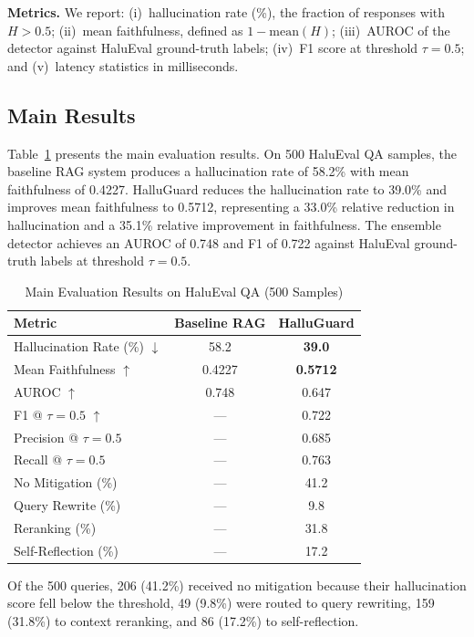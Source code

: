 \documentclass[conference]{IEEEtran}
\begin{document}
\textbf{Metrics.} We report: (i)~hallucination rate (\%), the fraction of responses with $H > 0.5$; (ii)~mean faithfulness, defined as $1 - \text{mean}(H)$; (iii)~AUROC of the detector against HaluEval ground-truth labels; (iv)~F1 score at threshold $\tau = 0.5$; and (v)~latency statistics in milliseconds.

\subsection{Main Results}

Table~\ref{tab:main_results} presents the main evaluation results. On 500 HaluEval QA samples, the baseline RAG system produces a hallucination rate of 58.2\% with mean faithfulness of 0.4227. HalluGuard reduces the hallucination rate to 39.0\% and improves mean faithfulness to 0.5712, representing a 33.0\% relative reduction in hallucination and a 35.1\% relative improvement in faithfulness. The ensemble detector achieves an AUROC of 0.748 and F1 of 0.722 against HaluEval ground-truth labels at threshold $\tau = 0.5$.

\begin{table}[t]
\centering
\caption{Main Evaluation Results on HaluEval QA (500 Samples)}
\label{tab:main_results}
\begin{tabular}{lcc}
\toprule
\textbf{Metric} & \textbf{Baseline RAG} & \textbf{HalluGuard} \\
\midrule
Hallucination Rate (\%) $\downarrow$ & 58.2 & \textbf{39.0} \\
Mean Faithfulness $\uparrow$ & 0.4227 & \textbf{0.5712} \\
AUROC $\uparrow$ & 0.748 & 0.647 \\
F1 @ $\tau=0.5$ $\uparrow$ & --- & 0.722 \\
Precision @ $\tau=0.5$ & --- & 0.685 \\
Recall @ $\tau=0.5$ & --- & 0.763 \\
\midrule
No Mitigation (\%) & --- & 41.2 \\
Query Rewrite (\%) & --- & 9.8 \\
Reranking (\%) & --- & 31.8 \\
Self-Reflection (\%) & --- & 17.2 \\
\bottomrule
\end{tabular}
\end{table}

Of the 500 queries, 206 (41.2\%) received no mitigation because their hallucination score fell below the threshold, 49 (9.8\%) were routed to query rewriting, 159 (31.8\%) to context reranking, and 86 (17.2\%) to self-reflection.
\end{document}
